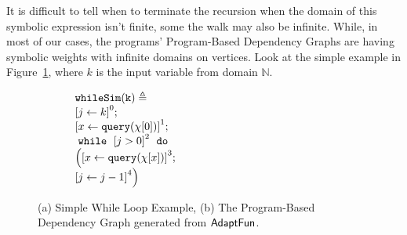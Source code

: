 It is difficult to tell when to terminate the recursion when the domain of this symbolic expression isn't finite, some the walk may also be infinite.
While, in most of our cases, the programs' Program-Based Dependency Graphs are having symbolic weights with infinite domains on vertices.
Look at the simple example in Figure~\ref{fig:alg_adaptsearch_simplewhile}, where $k$ is the input variable from domain $\mathbb{N}$.
\begin{figure}
  \centering
  {
  \begin{subfigure}{.25\textwidth}
  \begin{centering}
  $ 
  \begin{array}{l}
    \kw{whileSim(k)} \triangleq \\
    \clabel{ \assign{j}{k} }^{0} ; \\
    \clabel{ \assign{x}{\query(\chi[0])} }^{1} ; \\
        \ewhile ~ \clabel{j > 0}^{2} ~ \edo ~ \\
        \Big(
         \clabel{\assign{x}{\query(\chi[x]) }}^{3}  ; \\
        \clabel{\assign{j}{j-1}}^{4}       \Big)
    \end{array}
  $
  \caption{}
  \end{centering}
  \end{subfigure}
  \quad
    \begin{subfigure}{.6\textwidth}
    \begin{centering}
  \caption{}
    \end{centering}
    \end{subfigure}
  }
   \caption{(a) Simple While Loop Example, (b) The Program-Based Dependency Graph generated from $\textsf{AdaptFun}$.}
  \label{fig:alg_adaptsearch_simplewhile}
  \end{figure}
